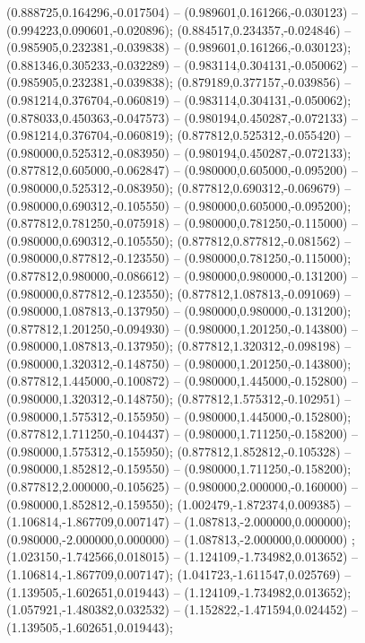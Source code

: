  (0.888725,0.164296,-0.017504) -- (0.989601,0.161266,-0.030123) -- (0.994223,0.090601,-0.020896);
 (0.884517,0.234357,-0.024846) -- (0.985905,0.232381,-0.039838) -- (0.989601,0.161266,-0.030123);
 (0.881346,0.305233,-0.032289) -- (0.983114,0.304131,-0.050062) -- (0.985905,0.232381,-0.039838);
 (0.879189,0.377157,-0.039856) -- (0.981214,0.376704,-0.060819) -- (0.983114,0.304131,-0.050062);
 (0.878033,0.450363,-0.047573) -- (0.980194,0.450287,-0.072133) -- (0.981214,0.376704,-0.060819);
 (0.877812,0.525312,-0.055420) -- (0.980000,0.525312,-0.083950) -- (0.980194,0.450287,-0.072133);
 (0.877812,0.605000,-0.062847) -- (0.980000,0.605000,-0.095200) -- (0.980000,0.525312,-0.083950);
 (0.877812,0.690312,-0.069679) -- (0.980000,0.690312,-0.105550) -- (0.980000,0.605000,-0.095200);
 (0.877812,0.781250,-0.075918) -- (0.980000,0.781250,-0.115000) -- (0.980000,0.690312,-0.105550);
 (0.877812,0.877812,-0.081562) -- (0.980000,0.877812,-0.123550) -- (0.980000,0.781250,-0.115000);
 (0.877812,0.980000,-0.086612) -- (0.980000,0.980000,-0.131200) -- (0.980000,0.877812,-0.123550);
 (0.877812,1.087813,-0.091069) -- (0.980000,1.087813,-0.137950) -- (0.980000,0.980000,-0.131200);
 (0.877812,1.201250,-0.094930) -- (0.980000,1.201250,-0.143800) -- (0.980000,1.087813,-0.137950);
 (0.877812,1.320312,-0.098198) -- (0.980000,1.320312,-0.148750) -- (0.980000,1.201250,-0.143800);
 (0.877812,1.445000,-0.100872) -- (0.980000,1.445000,-0.152800) -- (0.980000,1.320312,-0.148750);
 (0.877812,1.575312,-0.102951) -- (0.980000,1.575312,-0.155950) -- (0.980000,1.445000,-0.152800);
 (0.877812,1.711250,-0.104437) -- (0.980000,1.711250,-0.158200) -- (0.980000,1.575312,-0.155950);
 (0.877812,1.852812,-0.105328) -- (0.980000,1.852812,-0.159550) -- (0.980000,1.711250,-0.158200);
 (0.877812,2.000000,-0.105625) -- (0.980000,2.000000,-0.160000) -- (0.980000,1.852812,-0.159550);
 (1.002479,-1.872374,0.009385) -- (1.106814,-1.867709,0.007147) -- (1.087813,-2.000000,0.000000);
 (0.980000,-2.000000,0.000000) -- (1.087813,-2.000000,0.000000) ;
 (1.023150,-1.742566,0.018015) -- (1.124109,-1.734982,0.013652) -- (1.106814,-1.867709,0.007147);
 (1.041723,-1.611547,0.025769) -- (1.139505,-1.602651,0.019443) -- (1.124109,-1.734982,0.013652);
 (1.057921,-1.480382,0.032532) -- (1.152822,-1.471594,0.024452) -- (1.139505,-1.602651,0.019443);
